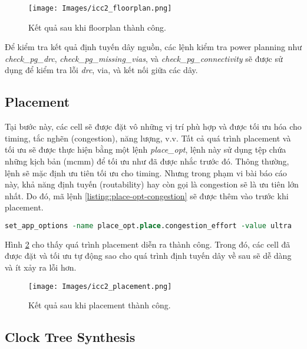 \begin{figure}[htp]
\centering
\captionsetup{justification=centering,margin=2cm}
\texttt{[image: Images/icc2\_floorplan.png]}
\caption{Kết quả sau khi floorplan thành công.}
\label{fig:icc2-floorplan}
\end{figure}

Để kiểm tra kết quả định tuyến dây nguồn, các lệnh kiểm tra power planning như \textit{check\_pg\_drc}, \textit{check\_pg\_missing\_vias}, và \textit{check\_pg\_connectivity} sẽ được sử dụng để kiểm tra lỗi \textit{drc}, via, và kết nối giữa các dây.

\subsection{Placement}

Tại bước này, các cell sẽ được đặt vô những vị trí phù hợp và được tối ưu hóa cho timing, tắc nghẽn (congestion), năng lượng, v.v. Tất cả quá trình placement và tối ưu sẽ được thực hiện bằng một lệnh \textit{place\_opt}, lệnh này sử dụng tệp chứa những kịch bản (\acrshort{mcmm}) để tối ưu như đã được nhắc trước đó. Thông thường, lệnh sẽ mặc định ưu tiên tối ưu cho timing. Nhưng trong phạm vi bài báo cáo này, khả năng định tuyến (routability) hay còn gọi là congestion sẽ là ưu tiên lớn nhất. Do đó, mã lệnh \ref{listing:place-opt-congestion} sẽ được thêm vào trước khi placement.

\begin{lstlisting}[language=tcl, caption=Ưu tiên khả năng định tuyến, label=listing:place-opt-congestion]
set_app_options -name place_opt.place.congestion_effort -value ultra
\end{lstlisting}
Hình \ref{fig:icc2-placement} cho thấy quá trình placement diễn ra thành công. Trong đó, các cell đã được đặt và tối ưu tự động sao cho quá trình định tuyến dây về sau sẽ dễ dàng và ít xảy ra lỗi hơn.

\begin{figure}[htp]
\centering
\captionsetup{justification=centering,margin=2cm}
\texttt{[image: Images/icc2\_placement.png]}
\caption{Kết quả sau khi placement thành công.}
\label{fig:icc2-placement}
\end{figure}

\subsection{Clock Tree Synthesis}

